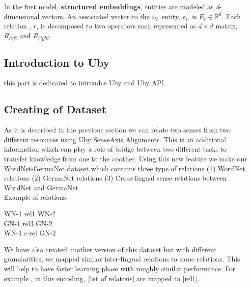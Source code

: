 \documentclass[11pt]{article}
\begin{document}
   In the first model, \textbf{structured embeddings}, entities are modeled as \textit{d}-dimensional vectors.
    An associated vector to the $i_{th}$ entity, $e_{i}$, is $E_{i} \in \mathbb{R}^{d}$. Each relation , $r$, 
    is decomposed to two operators each represented as $d \times d$ matrix, $R_{left}$ and $R_{right}$. 
   
   
  
  
   
   



\subsection{Introduction to Uby}
\label{ssect:uby}

this part is dedicated to introudce Uby and Uby API. 


\subsection{Creating of Dataset}
\label{ssec:uby-rel}

As it is described in the previous section we can relate two senses from two different resources using Uby SenseAxis Alignments.
This is an additional information which can play a role of bridge between two
different tasks to transfer knowledge from one to the another.
Using this new feature we make our WordNet-GermaNet dataset which contains three type of relations 
(1) WordNet relations 
(2) GermaNet relations
(3) Cross-lingual sense relations between WordNet and GermaNet
\\
Example of relations:
\begin{center}
WN-1 \hspace{0.5in}  rel1 \hspace{0.5in}   WN-2\\
GN-1 \hspace{0.5in} rel3 \hspace{0.5in}  GN-2\\
WN-1 \hspace{0.5in} c-rel \hspace{0.5in} GN-2\\
\end{center}

We have also created another version of this dataset but with different granularities, we mapped similar inter-lingual relations to same relations.
This will help to have faster learning phase with roughly similar performance.
For example , in this encoding, [list of relatons] are mapped to [rel1].
\end{document}
